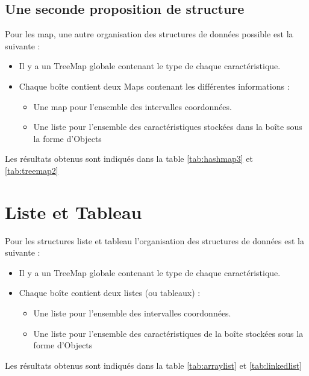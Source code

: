 \subsection{Une seconde proposition de structure}
Pour les map, une autre organisation des structures de données possible est la suivante :
\begin{itemize}
\item Il y a un TreeMap globale contenant le type de chaque caractéristique.
 \item Chaque boîte contient deux Maps contenant les différentes informations :
\begin{itemize}
 \item Une map pour l'ensemble des intervalles coordonnées.
\item Une liste pour l'ensemble des caractéristiques stockées dans la boîte sous la forme d'Objects
\end{itemize}
\end{itemize}

Les résultats obtenus sont indiqués dans la table \ref{tab:hashmap3} et \ref{tab:treemap2}



\section{Liste et Tableau}
Pour les structures liste et tableau l'organisation des structures de données est la suivante :
\begin{itemize}
\item Il y a un TreeMap globale contenant le type de chaque caractéristique.
 \item Chaque boîte contient deux listes (ou tableaux) :
\begin{itemize}
 \item Une liste pour l'ensemble des intervalles coordonnées.
\item Une liste pour l'ensemble des caractéristiques de la boîte stockées sous la forme d'Objects
\end{itemize}
\end{itemize}

Les résultats obtenus sont indiqués dans la table \ref{tab:arraylist} et \ref{tab:linkedlist}


